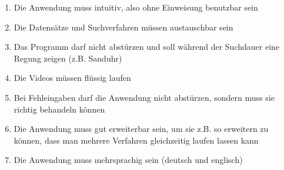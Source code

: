 \documentclass[parskip=full]{scrartcl}
\begin{document}
\begin{enumerate}[label=\bfseries /NF \arabic*0/]
  \item Die Anwendung muss intuitiv, also ohne Einweisung benutzbar sein
  \item Die Datensätze und Suchverfahren müssen austauschbar sein
  \item Das Programm darf nicht abstürzen und soll während der Suchdauer eine Regung zeigen (z.B. Sanduhr)
  \item Die Videos müssen flüssig laufen
  \item Bei Fehleingaben darf die Anwendung nicht abstürzen, sondern muss sie richtig behandeln können
  \item Die Anwendung muss gut erweiterbar sein, um sie z.B. so erweitern zu können, dass man mehrere Verfahren gleichzeitig laufen lassen kann
  \item Die Anwendung muss mehrsprachig sein (deutsch und englisch)
\end{enumerate}
\end{document}
